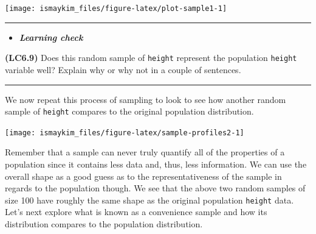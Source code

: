 \documentclass[]{tufte-book}
\newenvironment{Shaded}{\begin{snugshade}}{\end{snugshade}}
\newcommand{\KeywordTok}[1]{\textcolor[rgb]{0.13,0.29,0.53}{\textbf{{#1}}}}
\newcommand{\DataTypeTok}[1]{\textcolor[rgb]{0.13,0.29,0.53}{{#1}}}
\newcommand{\DecValTok}[1]{\textcolor[rgb]{0.00,0.00,0.81}{{#1}}}
\newcommand{\StringTok}[1]{\textcolor[rgb]{0.31,0.60,0.02}{{#1}}}
\newcommand{\OtherTok}[1]{\textcolor[rgb]{0.56,0.35,0.01}{{#1}}}
\newcommand{\NormalTok}[1]{{#1}}
\let\oldrule=\rule
\renewcommand{\rule}[1]{\oldrule{\linewidth}}
\newenvironment{rmdblock}[1]
  {\begin{shaded*}
  \begin{itemize}
  \renewcommand{\labelitemi}{
    \raisebox{-.7\height}[0pt][0pt]{
    }
  }
  \item
  }
  {
  \end{itemize}
  \end{shaded*}
  }
\newenvironment{learncheck}
  {\begin{rmdblock}{warning}}
  {\end{rmdblock}}
\theoremstyle{definition}
\theoremstyle{definition}
\theoremstyle{remark}
\begin{document}
\begin{center}\texttt{[image: ismaykim\_files/figure-latex/plot-sample1-1]} \end{center}

\begin{center}\rule{0.5\linewidth}{\linethickness}\end{center}

\begin{learncheck}
\textbf{\emph{Learning check}}
\end{learncheck}

\textbf{(LC6.9)} Does this random sample of \texttt{height} represent
the population \texttt{height} variable well? Explain why or why not in
a couple of sentences.

\begin{center}\rule{0.5\linewidth}{\linethickness}\end{center}

We now repeat this process of sampling to look to see how another random
sample of \texttt{height} compares to the original population
distribution.

\begin{Shaded}
\end{Shaded}

\begin{center}\texttt{[image: ismaykim\_files/figure-latex/sample-profiles2-1]} \end{center}

Remember that a sample can never truly quantify all of the properties of
a population since it contains less data and, thus, less information. We
can use the overall shape as a good guess as to the representativeness
of the sample in regards to the population though. We see that the above
two random samples of size 100 have roughly the same shape as the
original population \texttt{height} data. Let's next explore what is
known as a convenience sample and how its distribution compares to the
population distribution.
\end{document}
